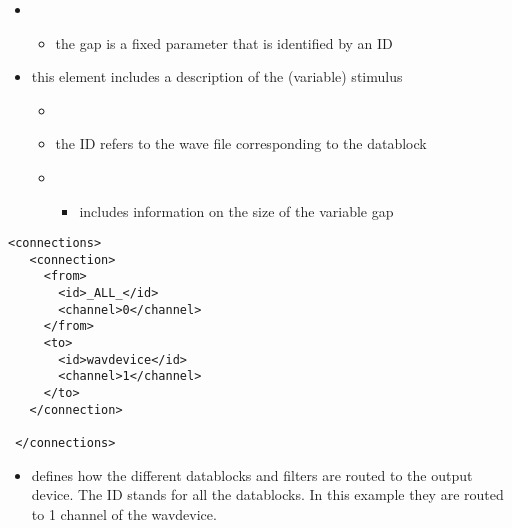 \begin{itemize}

\item {}

\begin{itemize}
\item {} the gap is a fixed parameter that is
identified by an ID
\end{itemize}

\item {} this element includes a description of
the (variable) stimulus

\begin{itemize}
\item {}

\item {} the ID refers to the wave file corresponding to the datablock

\item {}
\begin{itemize}
\item {} includes information on the size of the
variable gap
\end{itemize}

\end{itemize}
\end{itemize}








\begin{lstlisting}
<connections>
   <connection>
     <from>
       <id>_ALL_</id>
       <channel>0</channel>
     </from>
     <to>
       <id>wavdevice</id>
       <channel>1</channel>
     </to>
   </connection>

 </connections>
\end{lstlisting}

 

\begin{itemize}
\item {} defines how the different datablocks
and filters are routed to the output device. The ID 
stands for all the datablocks. In this example they are routed to
1 channel of the wavdevice.
\end{itemize}

